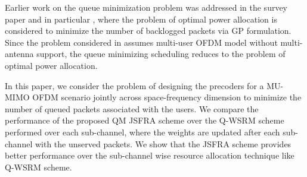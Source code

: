 Earlier work on the queue minimization problem was addressed in the survey paper \cite{berry2004cross} and in particular \cite{qps_cioffi}, where the problem of optimal power allocation is considered to minimize the number of backlogged packets via \acl{GP} formulation. Since the problem considered in \cite{qps_cioffi} assumes multi-user \ac{OFDM} model without multi-antenna support, the queue minimizing scheduling reduces to the problem of optimal power allocation.

In this paper, we consider the problem of designing the precoders for a \ac{MU-MIMO} \ac{OFDM} scenario jointly across space-frequency dimension to minimize the number of queued packets associated with the users. We compare the performance of the proposed \ac{QM} \ac{JSFRA} scheme over the \ac{Q-WSRM} scheme performed over each sub-channel, where the weights are updated after each sub-channel with the unserved packets. We show that the \ac{JSFRA} scheme provides better performance over the sub-channel wise resource allocation technique like \ac{Q-WSRM} scheme.
